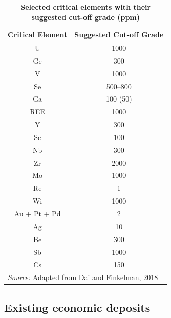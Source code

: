 \documentclass[11pt,a4paper,]{article}
\begin{document}
\begin{table}
\centering
\caption{\label{tab:cutoff-grade}\textbf{Selected critical elements with their suggested cut-off grade (ppm)}}
\centering
\begin{tabular}[t]{cc}
\toprule
Critical Element & Suggested Cut-off Grade\\
\midrule
U & 1000\\
Ge & 300\\
V & 1000\\
Se & 500–800\\
Ga & 100 (50)\\
\addlinespace
REE & 1000\\
Y & 300\\
Sc & 100\\
Nb & 300\\
Zr & 2000\\
\addlinespace
Mo & 1000\\
Re & 1\\
Wi & 1000\\
Au + Pt + Pd & 2\\
Ag & 10\\
\addlinespace
Be & 300\\
Sb & 1000\\
Cs & 150\\
\bottomrule
\multicolumn{2}{l}{\rule{0pt}{1em}\textit{Source: } Adapted from Dai and Finkelman, 2018}\\
\end{tabular}
\end{table}

\subsection{Existing economic deposits}\label{existing-economic-deposits}
\end{document}
